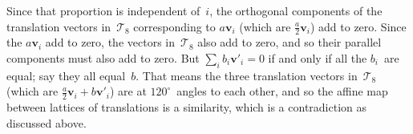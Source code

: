 Since that proportion is independent of~$i$, the orthogonal components
of the translation vectors in~$\mathcal{T}_8$ corresponding to $a
\mathbf{v}_i$ (which are $\frac{a}{2} \mathbf{v}_i$) add to zero.
Since the $a \mathbf{v}_i$ add to zero, the vectors in~$\mathcal{T}_8$
also add to zero, and so their parallel components must also add to
zero.  But $\sum_i b_i \mathbf{v}'_i = 0$ if and only if all the
$b_i$~are equal; say they all equal~$b$.  That means the three
translation vectors in~$\mathcal{T}_8$ (which are $\frac{a}{2}
\mathbf{v}_i + b \mathbf{v}'_i$) are at $120^\circ$~angles to each
other, and so the affine map between lattices of translations is a
similarity, which is a contradiction as discussed above.
